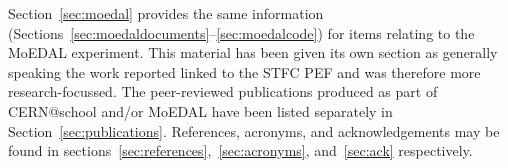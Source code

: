 Section~\ref{sec:moedal} provides the same information
(Sections~\ref{sec:moedaldocuments}--\ref{sec:moedalcode})
for items relating to the \ac{MoEDAL} experiment.
This material has been given its own section as
generally speaking the work reported linked to the \acs{STFC} \acs{PEF}
and was therefore more research-focussed.
%
The peer-reviewed publications produced as part of
CERN@school and/or \acs{MoEDAL} have been listed separately
in Section~\ref{sec:publications}.
%
References, acronyms, and acknowledgements may be found in
sections~\ref{sec:references},~\ref{sec:acronyms},
and~\ref{sec:ack} respectively.
